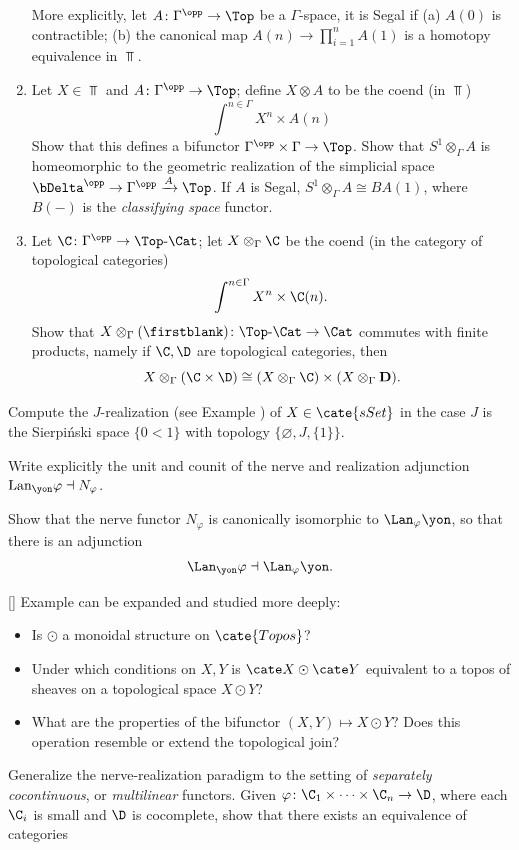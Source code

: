 \begin{exerciseset}
\begin{exercisepoints}
\begin{enumerate}
More explicitly, let $A\colon \Gamma^\opp\to \Top$ be a $\Gamma$-space, it is Segal if (a) $A(0)$ is contractible; (b) the canonical map $A(n)\to \prod_{i=1}^n A(1)$ is a homotopy equivalence in $\Top$.
\item Let $X\in\Top$ and $A\colon \Gamma^\opp\to \Top$; define $X\otimes A$ to be the coend (in $\Top$)
\[
\int^{n\in\Gamma} X^n\times A(n)
\] 
Show that this defines a bifunctor $\Gamma^\opp\times\Gamma\to\Top$. Show that $S^1\otimes_\Gamma A$ is homeomorphic to the geometric realization of the simplicial space $\bDelta^\opp\to \Gamma^\opp\xrightarrow{A}\Top$. If $A$ is Segal, $S^1\otimes_\Gamma A\cong BA(1)$, where $B(-)$ is the \emph{classifying space} functor.
\item Let $\C\colon \Gamma^\opp\to{\Top}\text{-}\Cat$; let $X\otimes_\Gamma \C$ be the coend (in the category of topological categories)
\[
\int^{n\in\Gamma} X^n\times \C(n).
\]
Show that $X\otimes_\Gamma (\firstblank) \colon {\Top}\text{-}\Cat\to \Cat$ commutes with finite products, namely if $\C, \D$ are topological categories, then 
\[
X\otimes_\Gamma({\C\times \D})\cong (X\otimes_\Gamma\C)\times (X\otimes_\Gamma {\bf D}).
\]
\end{enumerate}
\item Compute the $J$-realization (see Example ) of $X\in \cate{sSet}$ in the case $J$ is the Sierpi\'nski space $\{0 < 1\}$ with topology $\{\varnothing, J, \{1\}\}$.
\item \label{unit-and-counit} Write explicitly the unit and counit of the nerve and realization adjunction $\text{Lan}_\yon \varphi \dashv N_\varphi$.
\item Show that the nerve functor $N_\varphi$ is canonically isomorphic to $\Lan_\varphi\yon$, so that there is an adjunction
\[
\Lan_\yon\varphi \dashv \Lan_\varphi\yon.
\]
\item \label{ex:toposofic} [\awful] Example  can be expanded and studied more deeply:
\begin{itemize}
\item Is $\odot$ a monoidal structure on $\cate{Topos}$?
\item Under which conditions on $X,Y$ is $\cate X \odot \cate Y$ equivalent to a topos of sheaves on a topological space $X \odot Y$? 
\item What are the properties of the bifunctor $(X,Y)\mapsto X \odot Y$? Does this operation resemble or extend the topological join?
\end{itemize}
\item Generalize the nerve-realization paradigm to the setting of \emph{separately cocontinuous}, or \emph{multilinear} functors. Given $\varphi \colon \C_1 \times \dots \times \C_n \to \D$, where each $\C_i$ is small and $\D$ is cocomplete, show that there exists an equivalence of categories

\end{exercisepoints}
\end{exerciseset}

